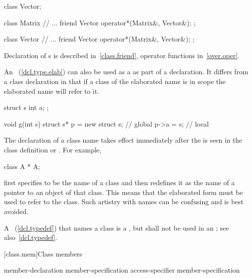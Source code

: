 \begin{codeblock}
class Vector;

class Matrix {
	// ...
	friend Vector operator*(Matrix&, Vector&);
};

class Vector {
	// ...
	friend Vector operator*(Matrix&, Vector&);
};
\end{codeblock}

Declaration of s is described in~\ref{class.friend},
operator functions in~\ref{over.oper}.
\exitexample
\exitnote

\pnum
{}%
%
An ~(\ref{dcl.type.elab}) can also
be used as a  as part of a declaration. It
differs from a class declaration in that if a class of the elaborated
name is in scope the elaborated name will refer to it.
\enterexample

\begin{codeblock}
struct s { int a; };

void g(int s)
{
	struct s* p = new struct s;	// global 
	p->a = s;			// local 
}
\end{codeblock}
\exitexampleb

\pnum
{}%
\enternote
The declaration of a class name takes effect immediately after the
 is seen in the class definition or
. For example,

\begin{codeblock}
class A * A;
\end{codeblock}

first specifies  to be the name of a class and then redefines
it as the name of a pointer to an object of that class. This means that
the elaborated form   must be used to refer to the
class. Such artistry with names can be confusing and is best avoided.
\exitnote

\pnum
{}%
A ~(\ref{dcl.typedef}) that names a class is
a , but shall not be used in an
; see also~\ref{dcl.typedef}.

[class.mem]{Class members}%
%

\begin{bnf}
\br
    member-declaration member-specification\opt\br
    access-specifier \terminal{:} member-specification\opt
\end{bnf}


